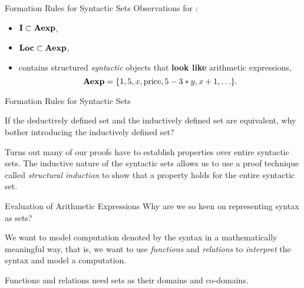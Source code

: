 \documentclass{beamer}
\begin{document}
\begin{frame}{Formation Rules for Syntactic Sets}
Observations for :
\begin{itemize}
\item $\mbox{\bf I} \subset \mbox{\bf Aexp}$,
\item $\mbox{\bf Loc} \subset \mbox{\bf Aexp}$,
\item contains structured {\em syntactic} objects that {\bf look like} arithmetic expressions,
\[
\mbox{\bf Aexp} = \{1,5,x,\mbox{price},5-3*y,x+1,\ldots\}.
\]
\end{itemize}
\end{frame}


\begin{frame}{Formation Rules for Syntactic Sets}

If the deductively defined set and the inductively defined set are equivalent, why bother introducing the inductively defined set?

\vspace{.2in}

Turns out many of our proofs have to establish properties over entire syntactic sets.  The inductive nature of the syntactic sets allows us to use a
proof technique called {\em structural induction} to show that a property holds for the entire syntactic set.

\end{frame}



\begin{frame}{\large Evaluation of Arithmetic Expressions}
Why are we so keen on representing syntax as sets?

\vspace{.1in}

We want to model computation denoted by the syntax in a mathematically meaningful
way, that is, we want to use {\em functions} and {\em relations} to {\em interpret} the syntax and model a computation.

\vspace{.1in}

Functions and relations need sets as their domains and co-domains.

\end{frame}
\end{document}
